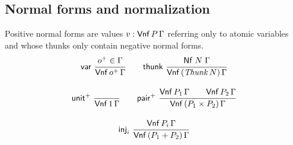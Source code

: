 \documentclass[sigplan,screen,fleqn]{acmart}
\begin{document}
\subsection{Normal forms and normalization}

Positive normal forms are values $v : \mathsf{Vnf}\,P\,\Gamma$
referring only to atomic variables and
whose thunks only
contain negative normal forms.
\begin{gather*}
  \nru{\tvar}{\patom \in \Gamma}{\PValNf {\patom} \Gamma}
\qquad
  \nru{\tthunk}{\Nf N \Gamma}{\PValNfP{\Thunk N}\Gamma}
\\[2ex]
  \nru{\punit}{}{\PValNf{\tyone}\Gamma}
\qquad
  \nru{\ppair}
      {\PValNf{P_1}\Gamma \qquad \PValNf{P_2}\Gamma}
      {\PValNfP{P_1 \times P_2}\Gamma}
\\[2ex]
  \nru{\tinj_i}{\PValNf{P_i}\Gamma}{\PValNfP{P_1 + P_2}\Gamma}
\end{gather*}
\end{document}
